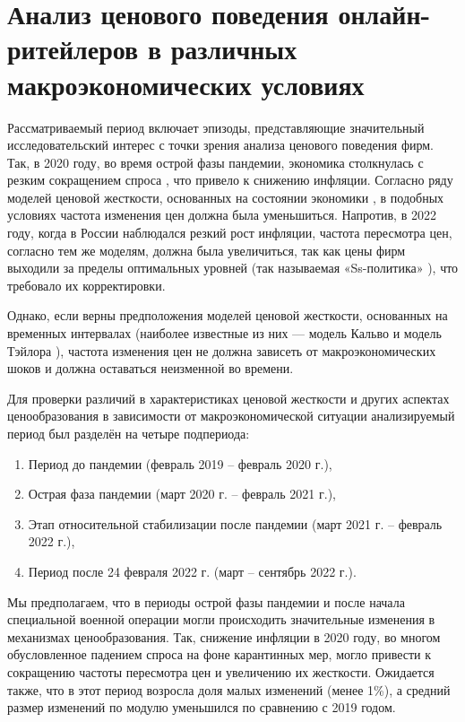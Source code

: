 \section{Анализ ценового поведения онлайн-ритейлеров в различных макроэкономических условиях}\label{sec:ch3/sec3}


Рассматриваемый период включает эпизоды, представляющие значительный исследовательский интерес с точки зрения анализа ценового поведения фирм. Так, в 2020 году, во время острой фазы пандемии, экономика столкнулась с резким сокращением спроса \cite{CBR2020}, что привело к снижению инфляции. Согласно ряду моделей ценовой жесткости, основанных на состоянии экономики \cite{CaplinSpulber1987, golosov2007}, в подобных условиях частота изменения цен должна была уменьшиться. Напротив, в 2022 году, когда в России наблюдался резкий рост инфляции, частота пересмотра цен, согласно тем же моделям, должна была увеличиться, так как цены фирм выходили за пределы оптимальных уровней (так называемая «Ss-политика» \cite{SheshinskiWeiss1977, Sheshinski1983}), что требовало их корректировки.  

Однако, если верны предположения моделей ценовой жесткости, основанных на временных интервалах (наиболее известные из них — модель Кальво \cite{Calvo1983} и модель Тэйлора \cite{Taylor1980}), частота изменения цен не должна зависеть от макроэкономических шоков и должна оставаться неизменной во времени.  

Для проверки различий в характеристиках ценовой жесткости и других аспектах ценообразования в зависимости от макроэкономической ситуации анализируемый период был разделён на четыре подпериода:
\begin{enumerate}
	\item Период до пандемии (февраль 2019 – февраль 2020 г.),
	\item Острая фаза пандемии (март 2020 г. – февраль 2021 г.),
	\item Этап относительной стабилизации после пандемии (март 2021 г. – февраль 2022 г.),
	\item Период после 24 февраля 2022 г. (март – сентябрь 2022 г.).
\end{enumerate}

Мы предполагаем, что в периоды острой фазы пандемии и после начала специальной военной операции могли происходить значительные изменения в механизмах ценообразования. Так, снижение инфляции в 2020 году, во многом обусловленное падением спроса на фоне карантинных мер, могло привести к сокращению частоты пересмотра цен и увеличению их жесткости. Ожидается также, что в этот период возросла доля малых изменений (менее 1\%), а средний размер изменений по модулю уменьшился по сравнению с 2019 годом.  

